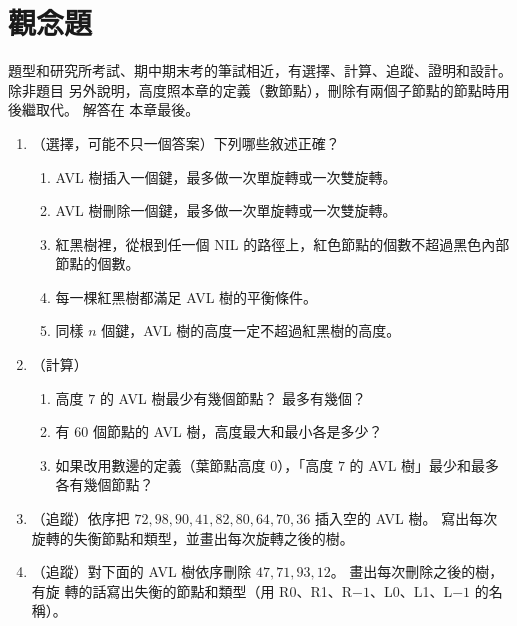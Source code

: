 \section{觀念題}
\label{sec:bal-exercises}

題型和研究所考試、期中期末考的筆試相近，有選擇、計算、追蹤、證明和設計。 除非題目
另外說明，高度照本章的定義（數節點），刪除有兩個子節點的節點時用後繼取代。 解答在
本章最後。

\begin{enumerate}
\item （選擇，可能不只一個答案）下列哪些敘述正確？
\begin{enumerate}
\item AVL 樹插入一個鍵，最多做一次單旋轉或一次雙旋轉。
\item AVL 樹刪除一個鍵，最多做一次單旋轉或一次雙旋轉。
\item 紅黑樹裡，從根到任一個 NIL 的路徑上，紅色節點的個數不超過黑色內部節點的個數。
\item 每一棵紅黑樹都滿足 AVL 樹的平衡條件。
\item 同樣 $n$ 個鍵，AVL 樹的高度一定不超過紅黑樹的高度。
\end{enumerate}

\item （計算）
\begin{enumerate}
\item 高度 $7$ 的 AVL 樹最少有幾個節點？ 最多有幾個？
\item 有 $60$ 個節點的 AVL 樹，高度最大和最小各是多少？
\item 如果改用數邊的定義（葉節點高度 $0$），「高度 $7$ 的 AVL 樹」最少和最多各有幾個節點？
\end{enumerate}

\item （追蹤）依序把 $72, 98, 90, 41, 82, 80, 64, 70, 36$ 插入空的 AVL 樹。 寫出每次
旋轉的失衡節點和類型，並畫出每次旋轉之後的樹。

\item （追蹤）對下面的 AVL 樹依序刪除 $47, 71, 93, 12$。 畫出每次刪除之後的樹，有旋
轉的話寫出失衡的節點和類型（用 R0、R1、R$-1$、L0、L1、L$-1$ 的名稱）。
\begin{center}
\end{center}


\end{enumerate}

